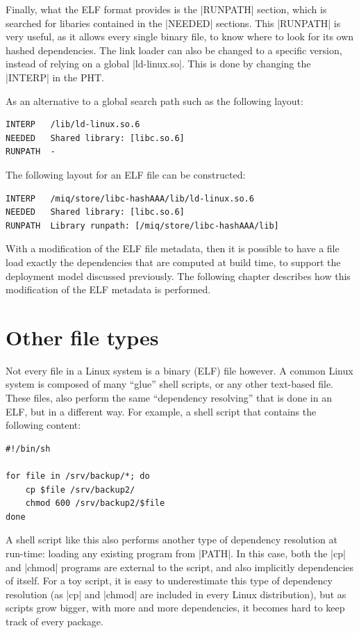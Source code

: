 Finally, what the ELF format provides is the |RUNPATH|
section, which is searched for libaries contained in the
|NEEDED| sections. This |RUNPATH| is very useful, as it
allows every single binary file, to know where to look for
its own hashed dependencies. The link loader can also be
changed to a specific version, instead of relying on a
global |ld-linux.so|. This is done by changing the
|INTERP| in the \ac{PHT}.


As an alternative to a global search path such as the
following layout:

\begin{verbatim}
INTERP   /lib/ld-linux.so.6
NEEDED   Shared library: [libc.so.6]
RUNPATH  -
\end{verbatim}

The following layout for an ELF file can be constructed:

\begin{verbatim}
INTERP   /miq/store/libc-hashAAA/lib/ld-linux.so.6
NEEDED   Shared library: [libc.so.6]
RUNPATH  Library runpath: [/miq/store/libc-hashAAA/lib]
\end{verbatim}

With a modification of the ELF file metadata, then it is
possible to have a file load exactly the dependencies that
are computed at build time, to support the deployment model
discussed previously. The following chapter describes how
this modification of the ELF metadata is performed.

\FloatBarrier
\section{Other file types}

Not every file in a Linux system is a binary (ELF) file
however. A common Linux system is composed of many ``glue''
shell scripts, or any other text-based file. These files,
also perform the same ``dependency resolving'' that is done
in an ELF, but in a different way. For example, a shell
script that contains the following content:

\begin{verbatim}
#!/bin/sh

for file in /srv/backup/*; do
    cp $file /srv/backup2/
    chmod 600 /srv/backup2/$file
done
\end{verbatim}

A shell script like this also performs another type of
dependency resolution at run-time: loading any existing
program from |PATH|. In this case, both the |cp| and |chmod|
programs are external to the script, and also implicitly
dependencies of itself. For a toy script, it is easy to
underestimate this type of dependency resolution (as |cp|
and |chmod| are included in every Linux distribution), but
as scripts grow bigger, with more and more dependencies, it
becomes hard to keep track of every package.

